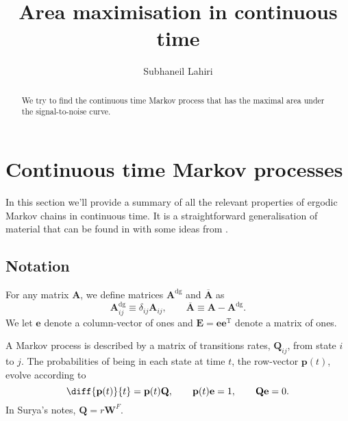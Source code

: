 \documentclass[12pt]{article}
\title{Area maximisation in continuous time}
\author{Subhaneil Lahiri
%
}
\newcommand{\dg}{^\mathrm{dg}}
\newcommand{\trans}{^\mathrm{T}}
\newcommand{\onev}{\mathbf{e}}
\newcommand{\onem}{\mathbf{E}}
\newcommand{\MM}{\mathbf{Q}}
\newcommand{\W}{\mathbf{W}}
\begin{document}
\maketitle




\begin{abstract}
  We try to find the continuous time Markov process that has the maximal area under the signal-to-noise curve.
\end{abstract}

\tableofcontents


\section{Continuous time Markov processes}\label{sec:ContMarkov}

In this section we'll provide a summary of all the relevant properties of ergodic Markov chains in continuous time.
It is a straightforward generalisation of material that can be found in \cite{kemeny1960finite} with some ideas from \cite{hunter2000survey}.


\subsection{Notation}\label{sec:not}

For any matrix $\mathbf{A}$, we define matrices $\mathbf{A}\dg$ and $\overline{\mathbf{A}}$ as
%
\begin{equation}\label{eq:dgdef}
  \mathbf{A}\dg_{ij} \equiv \delta_{ij}\mathbf{A}_{ij},
  \qquad
  \overline{\mathbf{A}} \equiv \mathbf{A}-\mathbf{A}\dg.
\end{equation}
%
We let $\onev$ denote a column-vector of ones and $\onem=\onev\onev\trans$ denote a matrix of ones.


A Markov process is described by a matrix of transitions rates, $\MM_{ij}$, from state $i$ to $j$.
The probabilities of being in each state at time $t$, the row-vector $\mathbf{p}(t)$, evolve according to
%
\begin{equation}\label{eq:rowsum}
  \diff{\mathbf{p}(t)}{t} = \mathbf{p}(t) \MM,
  \qquad
  \mathbf{p}(t)\onev=1,
  \qquad
  \MM\onev=0.
\end{equation}
%
In Surya's notes, $\MM=r\W^F$.
\end{document}
